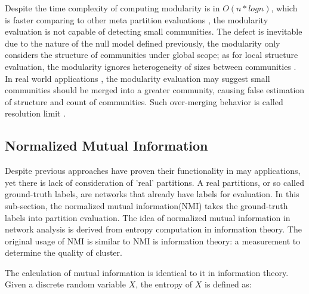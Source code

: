 \documentclass[12pt]{article}
\begin{document}
Despite the time complexity of computing modularity is in $O(n*log n)$, which is faster comparing to other meta partition evaluations \cite{2, 12}, the modularity evaluation is not capable of detecting small communities. The defect is inevitable due to the nature of the null model defined previously, the modularity only considers the structure of communities under global scope; as for local structure evaluation, the modularity ignores heterogeneity of sizes between communities \cite{13}. In real world applications \cite{9, 10}, the modularity evaluation may suggest small communities should be merged into a greater community, causing false estimation of structure and count of communities. Such over-merging behavior is called resolution limit \cite{13}.


\subsection{Normalized Mutual Information}


Despite previous approaches have proven their functionality in may applications, yet there is lack of consideration of 'real' partitions. A real partitions, or so called ground-truth labels, are networks that already have labels for evaluation. In this sub-section, the normalized mutual information(NMI) takes the ground-truth labels into partition evaluation. The idea of normalized mutual information in network analysis is derived from entropy computation in information theory. The original usage of NMI is similar to NMI is information theory: a measurement to determine the quality of cluster\cite{23}. 

The calculation of mutual information is identical to it in information theory. Given a discrete random variable $X$, the entropy of $X$ is defined as:
\end{document}
